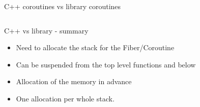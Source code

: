 \documentclass[10pt]{beamer}
\begin{document}
\begin{frame}{C++ coroutines vs library coroutines}
\begin{columns}[t]
\end{columns}

\end{frame}

\begin{frame}{C++ vs library - summary}
  \begin{itemize}[<+- |alert@+>]
  \item Need to allocate the stack for the Fiber/Coroutine
  \item Can be suspended from the top level functions and below
  \item Allocation of the memory in advance
  \item One allocation per whole stack.
  \end{itemize}
\end{frame}
\end{document}
